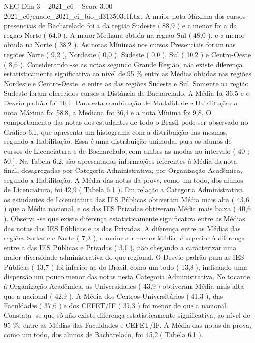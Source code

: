 \begin{textsample}{NEG Dim 3 – 2021\_c6 – Score 3.00 – 2021\_c6/enade\_2021\_ci\_bio\_d313503e1f.txt}
A maior nota Máxima dos cursos presenciais de Bacharelado foi a da região Sudeste ( 88,9 ) e a menor foi a da região Norte ( 64,0 ).
A maior Mediana obtida na região Sul ( 48,0 ), e a menor obtida na Norte ( 38,2 ).
As notas Mínimas nos cursos Presenciais foram nas regiões Norte ( 9,2 ), Nordeste ( 0,0 ), Sudeste ( 0,0 ), Sul ( 10,2 ) e Centro-Oeste ( 8,6 ).
Considerando -se as notas segundo Grande Região, não existe diferença estatisticamente significativa ao nível de 95 \% entre as Médias obtidas nas regiões Nordeste e Centro-Oeste, e entre as das regiões Sudeste e Sul.
Somente na região Sudeste foram oferecidos cursos a Distância de Bacharelado.
A Média foi 36,5 e o Desvio padrão foi 10,4.
Para esta combinação de Modalidade e Habilitação, a nota Máxima foi 58,8, a Mediana foi 36,4 e a nota Mínima foi 9,8.
O comportamento das notas dos estudantes de todo o Brasil pode ser observado no Gráfico 6.1, que apresenta um histograma com a distribuição das mesmas, segundo a Habilitação.
Essa é uma distribuição unimodal para os alunos de cursos de Licenciatura e de Bacharelado, com ambas as modas no intervalo ( 40 ; 50 ].
Na Tabela 6.2, são apresentadas informações referentes à Média da nota final, desagregadas por Categoria Administrativa, por Organização Acadêmica, segundo a Habilitação.
A Média das notas da prova, como um todo, dos alunos de Licenciatura, foi 42,9 ( Tabela 6.1 ).
Em relação a Categoria Administrativa, os estudantes de Licenciatura das IES Públicas obtiveram Média mais alta ( 43,6 ) que a Média nacional, e os das IES Privadas obtiveram Média mais baixa ( 40,6 ).
Observa -se que existe diferença estatisticamente significativa entre as Médias das notas das IES Públicas e as das Privadas.
A diferença entre as Médias das regiões Sudeste e Norte ( 7,3 ), a maior e a menor Média, é superior à diferença entre a das IES Públicas e Privadas ( 3,0 ), não chegando a caracterizar uma maior diversidade administrativa do que regional.
O Desvio padrão para as IES Públicas ( 13,7 ) foi inferior ao do Brasil, como um todo ( 13,8 ), indicando uma dispersão um pouco menor das notas nesta Categoria Administrativa.
No tocante à Organização Acadêmica, as Universidades ( 43,9 ) obtiveram Média mais alta que a nacional ( 42,9 ).
A Média dos Centros Universitários ( 41,3 ), das Faculdades ( 37,6 ) e dos CEFET/IF ( 39,3 ) foi menor do que a nacional.
Constata -se que só não existe diferença estatisticamente significativa, ao nível de 95 \%, entre as Médias das Faculdades e CEFET/IF.
A Média das notas da prova, como um todo, dos alunos de Bacharelado, foi 45,2 ( Tabela 6.1 ).

\end{textsample}
